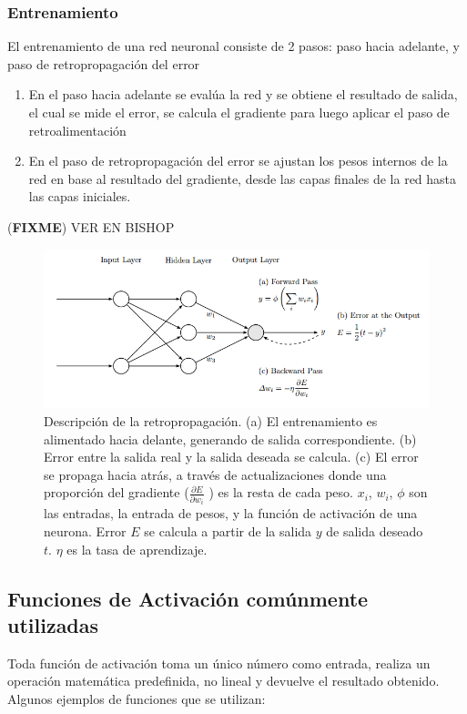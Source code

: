 \documentclass[a4paper,11pt,spanish]{book}
\newcommand*{\FIXME}[1]{{(\textbf{FIXME}) {#1}}}
\begin{document}
      \subsubsection {Entrenamiento}
	El entrenamiento de una red neuronal consiste de 2 pasos: paso hacia adelante, y paso de retropropagación del error
	\begin{enumerate}
	  \item En el paso hacia adelante se evalúa la red y se obtiene el resultado de salida, el cual se mide el error, se calcula el gradiente para luego aplicar el paso de retroalimentación
	  \item En el paso de retropropagación del error se ajustan los pesos internos de la red en base al resultado del gradiente, desde las capas finales de la red hasta las capas iniciales.
	\end{enumerate}
	\FIXME{VER EN BISHOP}
	\begin{figure}[H]
	  \begin{center}
	  \includegraphics[width=\linewidth]{./img/backprop.png}
	  \end{center}
	  \caption{ Descripción de la retropropagación. (a) El entrenamiento es alimentado hacia delante, generando de salida correspondiente. (b) Error entre la salida real y la salida deseada
	  se calcula. (c) El error se propaga hacia atrás, a través de actualizaciones donde una proporción del gradiente ($ \frac{\partial E}{\partial w_i}$ ) es la resta de cada peso. $x_i$, $w_i$, $\phi$ son las entradas,
	  la entrada de pesos, y la función de activación de una neurona. Error $E$ se calcula a partir de la salida $y$ de salida deseado $t$. $\eta$ es la tasa de aprendizaje.
	  \cite{Automatic_differentiation_ML} }
	  \label{fig:backprop}
	\end{figure}


      \subsection {Funciones de Activación comúnmente utilizadas}
	Toda función de activación toma un único número como entrada, realiza un operación matemática predefinida, no lineal y devuelve el resultado obtenido.
	Algunos ejemplos de funciones que se utilizan:
\end{document}
